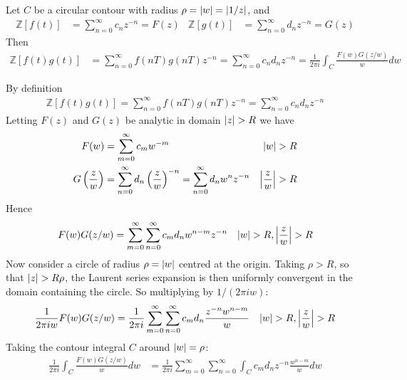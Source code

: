 \documentclass[12pt, english]{book}
\makeatletter
\renewenvironment{proof}[1][\proofname]{\par
	\pushQED{\qed}%
	\normalfont \topsep6\p@\@plus6\p@\relax
	\list{}{%
		\settowidth{\leftmargin}{\itshape\proofname:\hskip\labelsep}%
		\setlength{\labelwidth}{0pt}%
		\setlength{\itemindent}{-\leftmargin}%
		}%
	\item[\hskip\labelsep\itshape#1\@addpunct{:}]\ignorespaces
	}{\popQED\endlist\@endpefalse}
\makeatother
\begin{document}
	\begin{definition}
		Let \(C\) be a circular contour with radius \(\rho = \abs{w} = \abs{1/z}\), and
		\begin{align*}
			\mathbb{Z}[f(t)] &= \sum_{n=0}^{\infty} c_n z^{-n} = F(z) &
			\mathbb{Z}[g(t)] &= \sum_{n=0}^{\infty} d_n z^{-n} = G(z)
		\end{align*}
		Then
		\begin{align*}
			\mathbb{Z}[f(t)g(t)] 
			&= \sum_{n=0}^{\infty} f(nT) g(nT) z^{-n} = \sum_{n=0}^{\infty} c_n d_n z^{-n}
			 = \frac{1}{2\pi i} \int_{C} \frac{F(w)G(z/w)}{w} dw
		\end{align*}
	\end{definition}
	\begin{proof}
		By definition 
		\begin{align*}
			\mathbb{Z}[f(t)g(t)] = \sum_{n=0}^{\infty} f(nT) g(nT) z^{-n} = \sum_{n=0}^{\infty} c_n d_n z^{-n}
		\end{align*}
		Letting \(F(z)\) and \(G(z)\) be analytic in domain \(\abs{z}>R\) we have
		\begin{align*}
			F(w) &= \sum_{m=0}^{\infty} c_m w^{-m} & \abs{w} > R \\
			G\left(\frac{z}{w}\right) &= \sum_{n=0}^{\infty} d_n \left(\frac{z}{w}\right)^{-n} = \sum_{n=0}^{\infty} d_n w^n z^{-n} & \abs{\frac{z}{w}} > R
		\end{align*}
		Hence
		\begin{align*}
			F(w) G(z/w) &= \sum_{m=0}^{\infty} \sum_{n=0}^{\infty} c_m d_n w^{n-m} z^{-n}
				& \abs{w}>R, \abs{\frac{z}{w}}> R
		\end{align*}
		Now consider a circle of radius \(\rho = \abs{w}\) centred at the origin. Taking \(\rho > R\), so that \(\abs{z} > R\rho\), the Laurent series expansion is then uniformly convergent in the domain containing the circle. So multiplying by \(1/(2\pi i w)\):
		\begin{align*}
			\frac{1}{2\pi i w} F(w) G(z/w) 
			&= \frac{1}{2\pi i}\sum_{m=0}^{\infty} \sum_{n=0}^{\infty} c_m d_n \frac{z^{-n} w^{n-m}}{w}
				& \abs{w}>R, \abs{\frac{z}{w}}> R
		\end{align*}
		Taking the contour integral \(C\) around \(\abs{w} = \rho\):
		\begin{align*}
			\frac{1}{2\pi i} \int_{C} \frac{F(w)G(z/w)}{w} dw 
			&= \frac{1}{2\pi i} \sum_{m=0}^{\infty} \sum_{n=0}^{\infty} \int_{C} c_m d_n z^{-n} \frac{w^{n-m}}{w} dw
		\end{align*}

\end{proof}
\end{document}
